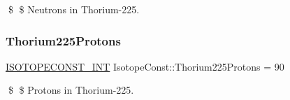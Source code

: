 \$ \$ Neutrons in Thorium-\/225. \mbox{\label{group___isotope_const-_thorium-_th225_ga5f6ac73542ca850ca0134c63b753270c}} 
\subsubsection{\texorpdfstring{Thorium225\+Protons}{Thorium225Protons}}
{\footnotesize\ttfamily \mbox{\hyperlink{group___isotope_const-_macros_ga5f18360b3e99483a35c32d789e62621c}{I\+S\+O\+T\+O\+P\+E\+C\+O\+N\+S\+T\+\_\+\+I\+NT}} Isotope\+Const\+::\+Thorium225\+Protons = 90}

\$ \$ Protons in Thorium-\/225. 